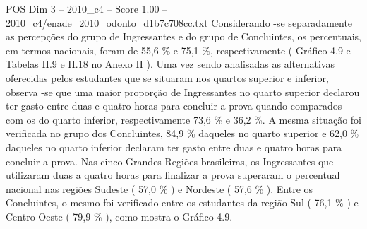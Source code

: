 \begin{textsample}{POS Dim 3 – 2010\_c4 – Score 1.00 – 2010\_c4/enade\_2010\_odonto\_d1b7c708cc.txt}
Considerando -se separadamente as percepções do grupo de Ingressantes e do grupo de Concluintes, os percentuais, em termos nacionais, foram de 55,6 \% e 75,1 \%, respectivamente ( Gráfico 4.9 e Tabelas II.9 e II.18 no Anexo II ).
Uma vez sendo analisadas as alternativas oferecidas pelos estudantes que se situaram nos quartos superior e inferior, observa -se que uma maior proporção de Ingressantes no quarto superior declarou ter gasto entre duas e quatro horas para concluir a prova quando comparados com os do quarto inferior, respectivamente 73,6 \% e 36,2 \%.
A mesma situação foi verificada no grupo dos Concluintes, 84,9 \% daqueles no quarto superior e 62,0 \% daqueles no quarto inferior declaram ter gasto entre duas e quatro horas para concluir a prova.
Nas cinco Grandes Regiões brasileiras, os Ingressantes que utilizaram duas a quatro horas para finalizar a prova superaram o percentual nacional nas regiões Sudeste ( 57,0 \% ) e Nordeste ( 57,6 \% ).
Entre os Concluintes, o mesmo foi verificado entre os estudantes da região Sul ( 76,1 \% ) e Centro-Oeste ( 79,9 \% ), como mostra o Gráfico 4.9.

\end{textsample}
